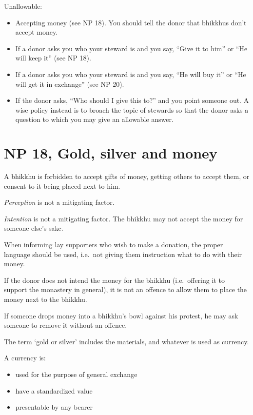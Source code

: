 Unallowable:

\begin{itemize}
\tightlist
\item
  Accepting money (see NP 18). You should tell the donor that bhikkhus
  don't accept money.
\item
  If a donor asks you who your steward is and you say, ``Give it to
  him'' or ``He will keep it'' (see NP 18).
\item
  If a donor asks you who your steward is and you say, ``He will buy
  it'' or ``He will get it in exchange'' (see NP 20).
\item
  If the donor asks, ``Who should I give this to?'' and you point
  someone out. A wise policy instead is to broach the topic of stewards
  so that the donor asks a question to which you may give an allowable
  answer.
\end{itemize}

\section{NP 18, Gold, silver and money}

A bhikkhu is forbidden to accept gifts of money, getting others to
accept them, or consent to it being placed next to him.

\emph{Perception} is not a mitigating factor.

\emph{Intention} is not a mitigating factor. The bhikkhu may not accept
the money for someone else's sake.

When informing lay supporters who wish to make a donation, the proper
language should be used, i.e.~not giving them instruction what to do
with their money.

If the donor does not intend the money for the bhikkhu (i.e.~offering it
to support the monastery in general), it is not an offence to allow them
to place the money next to the bhikkhu.

If someone drops money into a bhikkhu's bowl against his protest, he may
ask someone to remove it without an offence.

The term `gold or silver' includes the materials, and whatever is used
as currency.

A currency is:

\begin{itemize}
\tightlist
\item
  used for the purpose of general exchange
\item
  have a standardized value
\item
  presentable by any bearer
\end{itemize}

